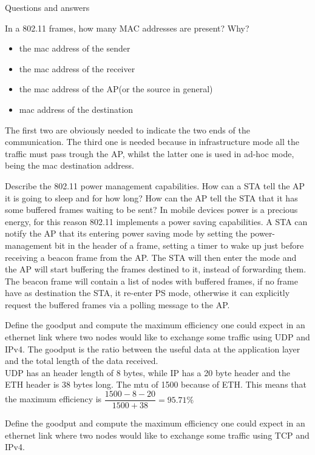 \begin{section}{Questions and answers}
\begin{subsubsection}{In a 802.11 frames, how many MAC addresses are present? Why?}
\begin{itemize}
      \item the mac address of the sender
      \item the mac address of the receiver
      \item the mac address of the AP(or the source in general)
      \item mac address of the destination
    \end{itemize}
    The first two are obviously needed to indicate the two ends of the communication. The third one
    is needed because in infrastructure mode all the traffic must pass trough the AP, whilst the
    latter one is used in ad-hoc mode, being the mac destination address.
  \end{subsubsection}
  \begin{subsubsection}{Describe the 802.11 power management capabilities. How can a STA tell the AP
      it is going to sleep and for how long? How can the AP tell the STA that it has some buffered
    frames waiting to be sent?}
    In mobile devices power is a precious energy, for this reason 802.11 implements a power saving
    capabilities. A STA can notify the AP that its entering power saving mode by setting the
    power-management bit in the header of a frame, setting a timer to wake up just before receiving 
    a beacon frame from the AP. The STA will then enter the mode and the AP will start buffering the
    frames destined to it, instead of forwarding them. The beacon frame will contain a list of
    nodes with buffered frames, if no frame have as destination the STA, it re-enter PS mode,
    otherwise it can explicitly request the buffered frames via a polling message to the AP.
  \end{subsubsection}
  \begin{subsubsection}{Define the goodput and compute the maximum efficiency one could expect in an
    ethernet link where two nodes would like to exchange some traffic using UDP and IPv4.}
    The goodput is the ratio between the useful data at the application layer and the total length
    of the data received.\\
    UDP has an header length of 8 bytes, while IP has a 20 byte header and the ETH header is 38
    bytes long. The mtu of 1500 because of ETH. This means that the maximum efficiency is
    $\dfrac{1500-8-20}{1500+38}=95.71\%$
  \end{subsubsection}
  \begin{subsubsection}{Define the goodput and compute the maximum efficiency one could expect in an
    ethernet link where two nodes would like to exchange some traffic using TCP and IPv4.}

\end{subsubsection}
\end{section}
